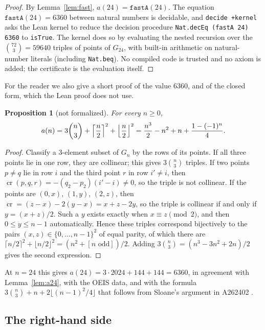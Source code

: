 \documentclass[11pt]{amsart}
\theoremstyle{plain}
\newtheorem{proposition}[theorem]{Proposition}
\theoremstyle{definition}
\newcommand{\cross}{\operatorname{cr}}
\begin{document}
\begin{proof}
By Lemma~\ref{lem:fast}, $a(24)=\mathtt{fastA}(24)$. The equation $\mathtt{fastA}(24)=6360$ between natural numbers is decidable, and \texttt{decide +kernel} asks the Lean kernel to reduce the decision procedure \texttt{Nat.decEq (fastA 24) 6360} to \texttt{isTrue}. The kernel does so by evaluating the nested recursion over the $\binom{72}{3}=59640$ triples of points of $G_{24}$, with built-in arithmetic on natural-number literals (including \texttt{Nat.beq}). No compiled code is trusted and no axiom is added; the certificate is the evaluation itself.
\end{proof}

For the reader we also give a short proof of the value $6360$, and of the closed form, which the Lean proof does not use.

\begin{proposition}[not formalized]\label{prop:closed}
For every $n\ge0$,
\[
  a(n)=3\binom n3+\Bigl\lceil\frac n2\Bigr\rceil^2+\Bigl\lfloor\frac n2\Bigr\rfloor^2
      =\frac{n^3}{2}-n^2+n+\frac{1-(-1)^n}{4}.
\]
\end{proposition}

\begin{proof}
Classify a $3$-element subset of $G_n$ by the rows of its points. If all three points lie in one row, they are collinear; this gives $3\binom n3$ triples. If two points $p\ne q$ lie in row $i$ and the third point $r$ in row $i'\ne i$, then $\cross(p,q,r)=-(q_2-p_2)(i'-i)\ne0$, so the triple is not collinear. If the points are $(0,x)$, $(1,y)$, $(2,z)$, then $\cross=(z-x)-2(y-x)=x+z-2y$, so the triple is collinear if and only if $y=(x+z)/2$. Such a $y$ exists exactly when $x\equiv z\pmod2$, and then $0\le y\le n-1$ automatically. Hence these triples correspond bijectively to the pairs $(x,z)\in\{0,\dots,n-1\}^2$ of equal parity, of which there are $\lceil n/2\rceil^2+\lfloor n/2\rfloor^2=(n^2+[n\text{ odd}])/2$. Adding $3\binom n3=(n^3-3n^2+2n)/2$ gives the second expression.
\end{proof}

At $n=24$ this gives $a(24)=3\cdot2024+144+144=6360$, in agreement with Lemma~\ref{lem:a24}, with the OEIS data, and with the formula $3\binom n3+n+2\lfloor(n-1)^2/4\rfloor$ that follows from Sloane's argument in A262402 \cite{A262402}.

\subsection{The right-hand side}
\end{document}
